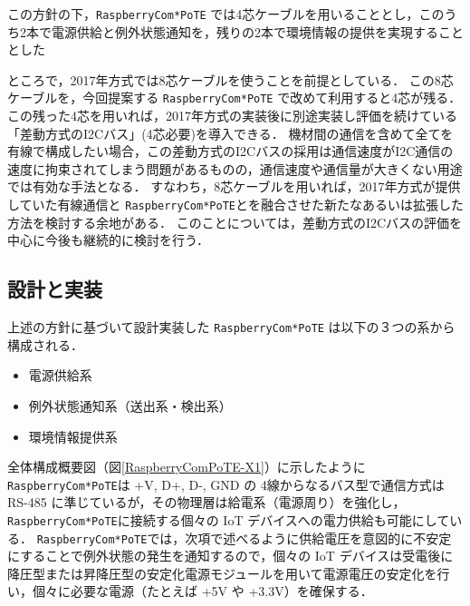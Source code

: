 この方針の下，{\tt Raspberry\-Com*PoTE} では4芯ケーブルを用いることとし，このうち2本で電源供給と例外状態通知を，残りの2本で環境情報の提供を実現することとした

ところで，2017年方式では8芯ケーブルを使うことを前提としている．
この8芯ケーブルを，今回提案する {\tt Raspberry\-Com*PoTE} で改めて利用すると4芯が残る．
この残った4芯を用いれば，2017年方式の実装後に別途実装し評価を続けている「差動方式のI2Cバス」(4芯必要)を導入できる．
機材間の通信を含めて全てを有線で構成したい場合，この差動方式のI2Cバスの採用は通信速度がI2C通信の速度に拘束されてしまう問題があるものの，通信速度や通信量が大きくない用途では有効な手法となる．
すなわち，8芯ケーブルを用いれば，2017年方式が提供していた有線通信と {\tt Raspberry\-Com*PoTE}とを融合させた新たなあるいは拡張した方法を検討する余地がある．
このことについては，差動方式のI2Cバスの評価を中心に今後も継続的に検討を行う．



\subsection{設計と実装}

上述の方針に基づいて設計実装した {\tt Raspberry\-Com*PoTE} は以下の３つの系から構成される．

\begin{itemize}
\item 電源供給系
\item 例外状態通知系（送出系・検出系）
\item 環境情報提供系
\end{itemize}


全体構成概要図（図\ref{RaspberryComPoTE-X1}）に示したように
 {\tt Raspberry\-Com*PoTE}は +V, D+, D-, GND の 4線からなるバス型で通信方式は RS-485 に準じているが，その物理層は給電系（電源周り）を強化し，{\tt Raspberry\-Com*PoTE}に接続する個々の IoT デバイスへの電力供給も可能にしている．
 {\tt Raspberry\-Com*PoTE}では，次項で述べるように供給電圧を意図的に不安定にすることで例外状態の発生を通知するので，個々の IoT デバイスは受電後に降圧型または昇降圧型の安定化電源モジュールを用いて電源電圧の安定化を行い，個々に必要な電源（たとえば +5V や +3.3V）を確保する．

